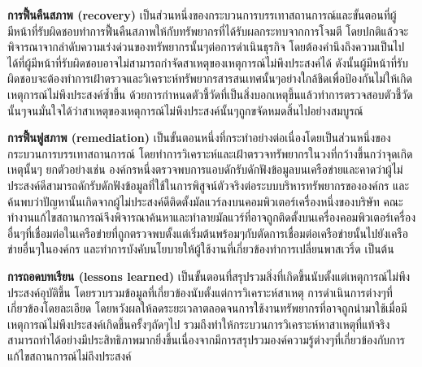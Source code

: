 \documentclass[../th_cyber_warfare_distilled.tex]{subfiles}
\begin{document}
\textbf{การฟื้นคืนสภาพ (recovery)} เป็นส่วนหนึ่งของกระบวนการบรรเทาสถานการณ์และขั้นตอนที่ผู้มีหน้าที่รับผิดชอบทำการฟื้นคืนสภาพให้กับทรัพยากรที่ได้รับผลกระทบจากการโจมตี โดยปกติแล้วจะพิจารณาจากลำดับความเร่งด่วนของทรัพยากรนั้นๆต่อการดำเนินธุรกิจ โดยต้องคำนึงถึงความเป็นไปได้ที่ผู้มีหน้าที่รับผิดชอบอาจไม่สามารถกำจัดสาเหตุของเหตุการณ์ไม่พึงประสงค์ได้ ดังนั้นผู้มีหน้าที่รับผิดชอบจะต้องทำการเฝ้าตรวจและวิเคราะห์ทรัพยากรสารสนเทศนั้นๆอย่างใกล้ชิดเพื่อป้องกันไม่ให้เกิดเหตุการณ์ไม่พึงประสงค์ซ้ำขึ้น ด้วยการกำหนดตัวชี้วัดที่เป็นสิ่งบอกเหตุขึ้นแล้วทำการตรวจสอบตัวชี้วัดนั้นๆจนมั่นใจได้ว่าสาเหตุของเหตุการณ์ไม่พึงประสงค์นั้นๆถูกขจัดหมดสิ้นไปอย่างสมบูรณ์

\textbf{การฟื้นฟูสภาพ (remediation)} เป็นขั้นตอนหนึ่งที่กระทำอย่างต่อเนื่องโดยเป็นส่วนหนึ่งของกระบวนการบรรเทาสถานการณ์ โดยทำการวิเคราะห์และเฝ้าตรวจทรัพยากรในวงที่กว้างขึ้นกว่าจุดเกิดเหตุนั้นๆ ยกตัวอย่างเช่น องค์กรหนึ่งตรวจพบการแอบดักรับดักฟังข้อมูลบนเครือข่ายและคาดว่าผู้ไม่ประสงค์ดีสามารถดักรับดักฟังข้อมูลที่ใช้ในการพิสูจน์ตัวจริงต่อระบบบริหารทรัพยากรขององค์กร และค้นพบว่าปัญหานั้นเกิดจากผู้ไม่ประสงค์ดีติดตั้งมัลแวร์ลงบนคอมพิวเตอร์เครื่องหนึ่งของบริษัท คณะทำงานแก้ไขสถานการณ์จึงพิจารณาค้นหาและทำลายมัลแวร์ที่อาจถูกติดตั้งบนเครื่องคอมพิวเตอร์เครื่องอื่นๆที่เชื่อมต่อในเครือข่ายที่ถูกตรวจพบตั้งแต่เริ่มต้นพร้อมๆกับตัดการเชื่อมต่อเครือข่ายนั้นไปยังเครือข่ายอื่นๆในองค์กร และทำการบังคับนโยบายให้ผู้ใช้งานที่เกี่ยวข้องทำการเปลี่ยนพาสเวริ์ด เป็นต้น

\textbf{การถอดบทเรียน (lessons learned)} เป็นขั้นตอนที่สรุปรวมสิ่งที่เกิดขึ้นนับตั้งแต่เหตุการณ์ไม่พึงประสงค์อุบัติขึ้น โดยรวบรวมข้อมูลที่เกี่ยวข้องนับตั้งแต่การวิเคราะห์สาเหตุ การดำเนินการต่างๆที่เกี่ยวข้องโดยละเอียด โดยหวังผลให้ลดระยะเวลาตลอดจนการใช้งานทรัพยากรที่อาจถูกนำมาใช้เมื่อมีเหตุการณ์ไม่พึงประสงค์เกิดขึ้นครั้งๆถัดๆไป รวมถึงทำให้กระบวนการวิเคราะห์หาสาเหตุที่แท้จริงสามารถทำได้อย่างมีประสิทธิภาพมากยิ่งขึ้นเนื่องจากมีการสรุปรวมองค์ความรู้ต่างๆที่เกี่ยวข้องกับการแก้ไขสถานการณ์ไม่ถึงประสงค์
\end{document}

